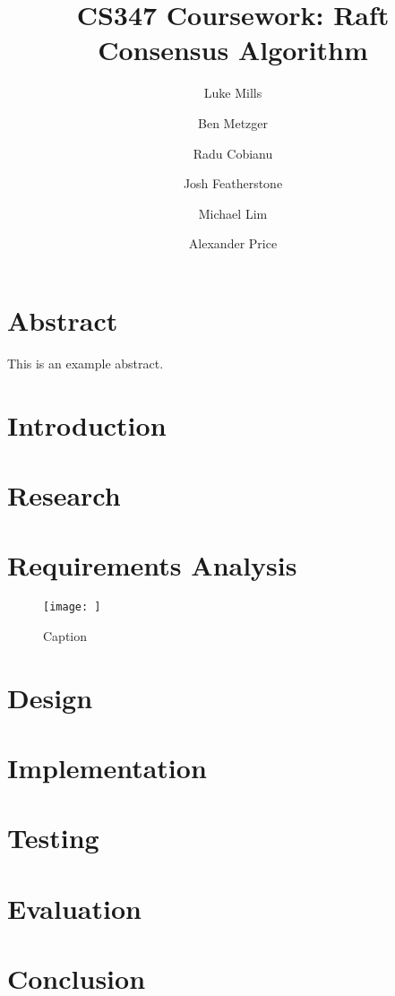 \documentclass{article}
\title{CS347 Coursework: Raft Consensus Algorithm}
\author{Luke Mills \and Ben Metzger \and Radu Cobianu \and Josh Featherstone \and Michael Lim \and Alexander Price}
\begin{document}
\maketitle

\section{Abstract}

This is an example abstract.

\section{Introduction}

\section{Research}

\section{Requirements Analysis}
    \begin{figure}
        \centering
        \texttt{[image: ]}
        \caption{Caption}
        \label{fig:my_label}
    \end{figure}

\section{Design}

\section{Implementation}

\section{Testing}

\section{Evaluation}

\section{Conclusion}



\end{document}

